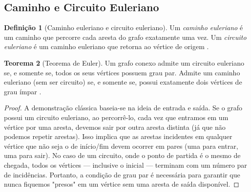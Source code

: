 \documentclass[
  12pt,
  oneside,
  a4paper,
  english,
  brazilian
  ]{abntex2}
\theoremstyle{definition}
\newtheorem{definicao}{Definição}[chapter]
\newtheorem{teorema}[definicao]{Teorema}
\begin{document}
\subsection{Caminho e Circuito Euleriano}
\label{sec:euleriano}

\begin{definicao}[Caminho euleriano e circuito euleriano]
\label{def:euleriano}
  Um \textit{caminho euleriano} é um caminho que percorre cada aresta do grafo
  exatamente uma vez. Um \textit{circuito euleriano} é um caminho euleriano
  que retorna ao vértice de origem \cite{euler1736}.
\end{definicao}

\begin{teorema}[Teorema de Euler]
\label{teo:euler}
  Um grafo conexo admite um circuito euleriano se, e somente se, todos os seus
  vértices possuem grau par. Admite um caminho euleriano (sem ser circuito) se,
  e somente se, possui exatamente dois vértices de grau ímpar
  \cite{diestel2017}.
\end{teorema}

\begin{proof}
  A demonstração clássica baseia-se na ideia de entrada e saída. Se o grafo possui um circuito euleriano, ao percorrê-lo, cada vez que entramos em um vértice por uma aresta, devemos sair por outra aresta distinta (já que não podemos repetir arestas). Isso implica que as arestas incidentes em qualquer vértice que não seja o de início/fim devem ocorrer em pares (uma para entrar, uma para sair). No caso de um circuito, onde o ponto de partida é o mesmo de chegada, todos os vértices — inclusive o inicial — terminam com um número par de incidências. Portanto, a condição de grau par é necessária para garantir que nunca fiquemos "presos" em um vértice sem uma aresta de saída disponível.
\end{proof}
\end{document}

